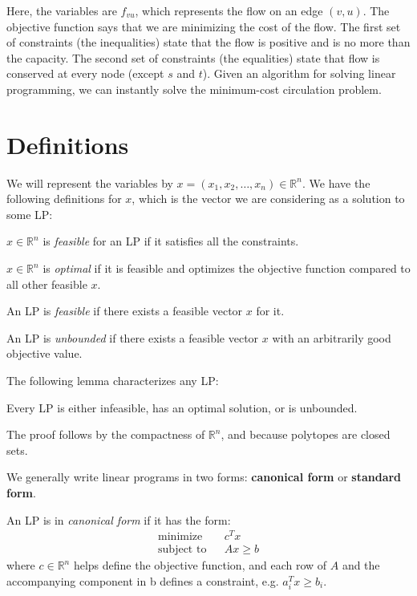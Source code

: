 \documentclass{article}
\newcommand{\reals}{\ensuremath{\mathbb{R}}}
\begin{document}
Here, the variables are $f_{vu}$, which represents the flow on an edge
$(v,u)$.  The objective function says that we are minimizing the cost
of the flow.  The first set of constraints (the inequalities) state that the flow is positive and is no
more than the capacity.  The second set of constraints (the equalities) state that flow is conserved at every node (except $s$ and $t$). Given an algorithm for solving linear programming, we can instantly solve the minimum-cost circulation problem.

\section{Definitions}

We will represent the variables by $x = (x_1, x_2, \dots, x_n) \in
\reals^n$.  We have the following definitions for $x$, which  is the
vector we are considering as a solution to some LP:

\begin{definition}
  $x \in \reals^n$ is \emph{feasible} for an LP if it satisfies all
  the constraints.
\end{definition}

\begin{definition}
  $x \in \reals^n$ is \emph{optimal} if it is feasible and optimizes
  the objective function compared to all other feasible $x$.
\end{definition}

\begin{definition}
  An LP is \emph{feasible} if there exists a feasible vector $x$ for
  it.
\end{definition}

\begin{definition}
  An LP is \emph{unbounded} if there exists a feasible vector $x$ with
  an arbitrarily good objective value.
\end{definition}

The following lemma characterizes any LP:

\begin{lemma}
  Every LP is either infeasible, has an optimal solution, or is unbounded.
\end{lemma}

The proof follows by the compactness of $\reals^n$, and because
polytopes are closed sets.

We generally write linear programs in two forms: \textbf{canonical
  form} or \textbf{standard form}.

\begin{definition}
  An LP is in \emph{canonical form} if it has the form:
  \begin{eqnarray*}
    \textrm{minimize } & & c^T x\\
    \textrm{subject to} & & Ax \geq b
  \end{eqnarray*}
  where $c \in \reals^n$ helps define the objective function, and each row of
  $A$ and the accompanying component in b defines a constraint, e.g. $a_i^T x \geq b_i$.
\end{definition}
\end{document}
